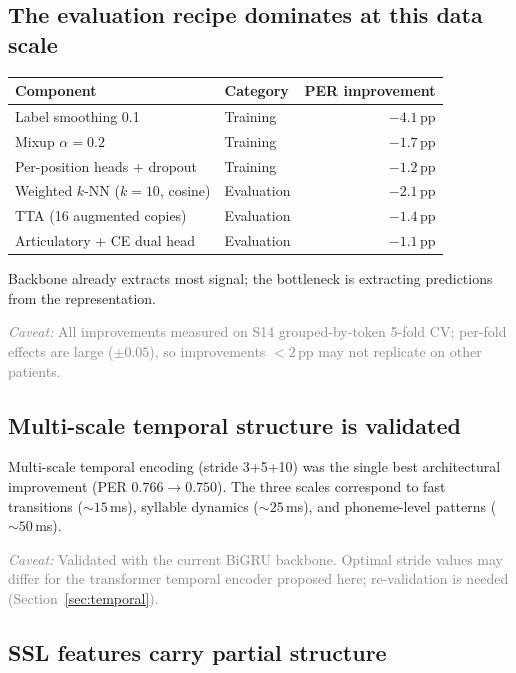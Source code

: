 \documentclass[11pt,letterpaper]{article}
\newcommand{\caveat}[1]{\par\smallskip\noindent\textcolor{gray}{\textit{Caveat:} #1}\smallskip}
\newcommand{\pp}{\,\text{pp}}
\begin{document}
\subsection{The evaluation recipe dominates at this data scale}

\begin{table}[ht!]
\centering\small
\begin{tabular}{@{}llr@{}}
\toprule
\textbf{Component} & \textbf{Category} & \textbf{PER improvement} \\
\midrule
Label smoothing 0.1 & Training & $-4.1\pp$ \\
Mixup $\alpha{=}0.2$ & Training & $-1.7\pp$ \\
Per-position heads + dropout & Training & $-1.2\pp$ \\
\midrule
Weighted $k$-NN ($k{=}10$, cosine) & Evaluation & $-2.1\pp$ \\
TTA (16 augmented copies) & Evaluation & $-1.4\pp$ \\
Articulatory + CE dual head & Evaluation & $-1.1\pp$ \\
\bottomrule
\end{tabular}
\end{table}

\noindent Backbone already extracts most signal; the bottleneck is extracting predictions from the representation.

\caveat{All improvements measured on S14 grouped-by-token 5-fold CV; per-fold effects are large (${\pm}0.05$), so improvements ${<}2\pp$ may not replicate on other patients.}

\subsection{Multi-scale temporal structure is validated}

Multi-scale temporal encoding (stride 3+5+10) was the single best architectural improvement (PER $0.766 \to 0.750$). The three scales correspond to fast transitions (${\sim}15$\,ms), syllable dynamics (${\sim}25$\,ms), and phoneme-level patterns (${\sim}50$\,ms).

\caveat{Validated with the current BiGRU backbone. Optimal stride values may differ for the transformer temporal encoder proposed here; re-validation is needed (Section~\ref{sec:temporal}).}

\subsection{SSL features carry partial structure}
\end{document}
